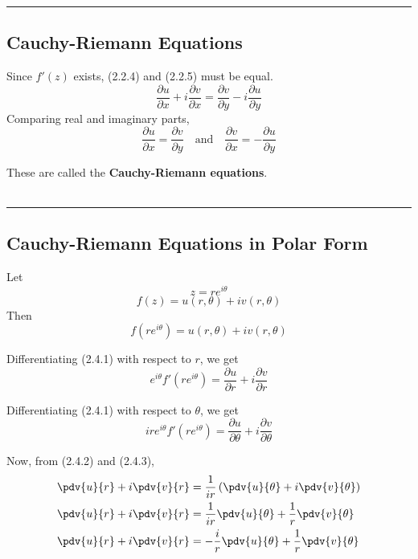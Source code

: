 \vspace{20pt}\rule{3in}{1pt}


\subsection{Cauchy-Riemann Equations}
Since $f'(z)$ exists, (2.2.4) and (2.2.5) must be equal.
\begin{equation}
    \frac{\partial u}{\partial x} + i\frac{\partial v}{\partial x} = \frac{\partial v}{\partial y} - i\frac{\partial u}{\partial y}
\end{equation}
Comparing real and imaginary parts,
\begin{equation}
    \boxed{ \frac{\partial u}{\partial x} = \frac{\partial v}{\partial y} }
    \quad \text{and} \quad 
    \boxed{ \frac{\partial v}{\partial x} = -\frac{\partial u}{\partial y} }
\end{equation}

These are called the \textbf{Cauchy-Riemann equations}. \\~\\

\vspace{20pt}\rule{3in}{1pt}


\subsection{Cauchy-Riemann Equations in Polar Form}
Let \[
    z = re^{i\theta}
\] \[
    f(z) = u(r,\theta) + iv(r,\theta)
\] 
Then
\begin{equation}
    f(re^{i\theta}) = u(r,\theta) + iv(r,\theta)
\end{equation}

Differentiating (2.4.1) with respect to $r$, we get
\begin{equation}
    e^{i\theta}f'(re^{i\theta}) = \frac{\partial u}{\partial r} + i\frac{\partial v}{\partial r}
\end{equation}

Differentiating (2.4.1) with respect to $\theta$, we get
\begin{equation}
    ire^{i\theta}f'(re^{i\theta}) = \frac{\partial {u}}{\partial {\theta}} + i\frac{\partial {v}}{\partial {\theta}}
\end{equation}

Now, from (2.4.2) and (2.4.3),
\begin{align*}
    \pdv{u}{r} + i \pdv{v}{r} &= \frac{1}{ir} \left( \pdv{u}{\theta} + i \pdv{v}{\theta} \right)  \\
    \pdv{u}{r} + i \pdv{v}{r} &= \frac{1}{ir} \pdv{u}{\theta} + \frac{1}{r} \pdv{v}{\theta} \\
    \pdv{u}{r} + i \pdv{v}{r} &= -\frac{i}{r} \pdv{u}{\theta} + \frac{1}{r} \pdv{v}{\theta}
\end{align*}

